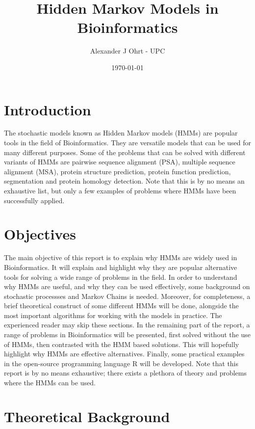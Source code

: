 \documentclass{article}\usepackage[]{graphicx}\usepackage[]{color}
\title{Hidden Markov Models in Bioinformatics}
\author{Alexander J Ohrt - UPC}
\date{\today}
\begin{document}
\maketitle

\tableofcontents

\section{Introduction}
The stochastic models known as Hidden Markov models (HMMs) are popular tools in the field of Bioinformatics. They are versatile models that can be used for many different purposes. Some of the problems that can be solved with different variants of HMMs are pairwise sequence alignment (PSA), multiple sequence alignment (MSA), protein structure prediction, protein function prediction, segmentation and protein homology detection. Note that this is by no means an exhaustive list, but only a few examples of problems where HMMs have been successfully applied. 

\section{Objectives}

The main objective of this report is to explain why HMMs are widely used in Bioinformatics. It will explain and highlight why they are popular alternative tools for solving a wide range of problems in the field. In order to understand why HMMs are useful, and why they can be used effectively, some background on stochastic processses and Markov Chains is needed. Moreover, for completeness, a brief theoretical construct of some different HMMs will be done, alongside the most important algorithms for working with the models in practice. The experienced reader may skip these sections. In the remaining part of the report, a range of problems in Bioinformatics will be presented, first solved without the use of HMMs, then contrasted with the HMM based solutions. This will hopefully highlight why HMMs are effective alternatives. Finally, some practical examples in the open-source programming language R will be developed. Note that this report is by no means exhaustive; there exists a plethora of theory and problems where the HMMs can be used. 

\section{Theoretical Background}
\end{document}
